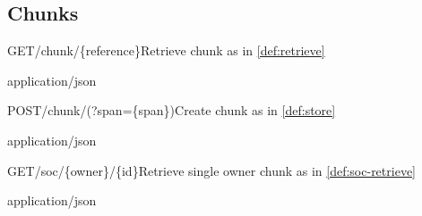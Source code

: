 \subsection{Chunks}

\begin{apiRoute}{GET}{/chunk/\{reference\}}{Retrieve chunk as in \ref{def:retrieve}}
{
}
{ }

\begin{routeParameter} 
\end{routeParameter}
\begin{headerParameter} 
\end{headerParameter}
\begin{routeResponse}{application/json}
\end{routeResponse}
\end{apiRoute}




\begin{apiRoute}{POST}{/chunk/(?span=\{span\})}{Create chunk as in \ref{def:store}}
{
}
{ }

\begin{queryParameter} 
\end{queryParameter}

\begin{headerParameter} 
\end{headerParameter}

\begin{routeResponse}{application/json}

\end{routeResponse}
\end{apiRoute}




\begin{apiRoute}{GET}{/soc/\{owner\}/\{id\}}{Retrieve single owner chunk as in \ref{def:soc-retrieve} }
{
}
{ }

\begin{routeParameter} 
\end{routeParameter}
\begin{queryParameter} 
\end{queryParameter}
\begin{routeResponse}{application/json}

\end{routeResponse}
\end{apiRoute}




